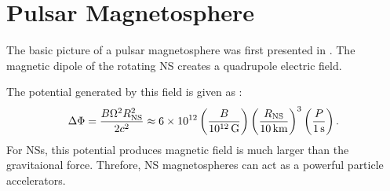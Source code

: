 \section{Pulsar Magnetosphere}

The basic picture of a pulsar magnetosphere was first presented in
\cite{goldreich_1969_pulsar-electrodynamics}.  The magnetic dipole
of the rotating \ac{NS} creates a quadrupole electric field.

The potential generated
by this field is given as \citep{goldreich_1969_pulsar-electrodynamics}:
\begin{equation}
\Delta \Phi = \frac{B \Omega^2 R_\text{NS}^2}{2c^2}
\approx 6\times 10^{12} 
\left(\frac{B}{10^{12}\,\text{G}}\right)
\left(\frac{R_\text{NS}}{10\,\text{km}}\right)^3
\left(\frac{P}{1\,\text{s}}\right).
\end{equation}
For \acp{NS}, this potential produces magnetic field is much larger than
the gravitaional force. Threfore, \ac{NS} magnetospheres can act as a
powerful particle accelerators.



